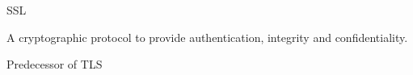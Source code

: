 \documentclass[main.tex]{subfiles}
\begin{document}
\begin{card}{SSL}
\item A cryptographic protocol to provide authentication, integrity and confidentiality.
\item Predecessor of TLS
\end{card}



\end{document}

